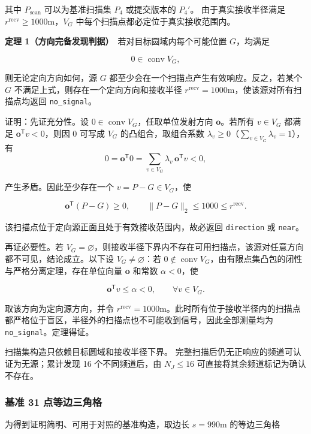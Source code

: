 其中 $P_{\mathrm{scan}}$ 可以为基准扫描集 $P_4$ 或提交版本的 $P_4'$。
由于真实接收半径满足 $r^{\mathrm{recv}}\ge1000\mathrm{m}$，$V_G$ 中每个扫描点都必定位于真实接收范围内。

\textbf{定理 1（方向完备发现判据）}　若对目标圆域内每个可能位置 $G$，均满足

\begin{equation}
0\in\operatorname{conv}V_G,
\label{eq:q4_direction_certificate}
\end{equation}

则无论定向方向如何，源 $G$ 都至少会在一个扫描点产生有效响应。反之，若某个 $G$ 不满足上式，则存在一个定向方向和接收半径 $r^{\mathrm{recv}}=1000\mathrm{m}$，使该源对所有扫描点均返回 \texttt{no\_signal}。

证明：先证充分性。设 $0\in\operatorname{conv}V_G$，任取单位发射方向 $\boldsymbol o$。若所有 $v\in V_G$ 都满足 $\boldsymbol o^{\mathsf T}v<0$，则因 $0$ 可写成 $V_G$ 的凸组合，取组合系数 $\lambda_v\ge0$（$\sum_{v\in V_G}\lambda_v=1$），有
\[
0=\boldsymbol o^{\mathsf T}0=\sum_{v\in V_G}\lambda_v\,\boldsymbol o^{\mathsf T}v<0,
\]

产生矛盾。因此至少存在一个 $v=P-G\in V_G$，使

\[
\boldsymbol o^{\mathsf T}(P-G)\ge0,
\qquad
\lVert P-G\rVert_2\le1000\le r^{\mathrm{recv}}.
\]

该扫描点位于定向源正面且处于有效接收范围内，故必返回 \texttt{direction} 或 \texttt{near}。

再证必要性。若 $V_G=\varnothing$，则接收半径下界内不存在可用扫描点，该源对任意方向都不可见，结论成立。以下设 $V_G\ne\varnothing$：若 $0\notin\operatorname{conv}V_G$，由有限点集凸包的闭性与严格分离定理，存在单位向量 $\boldsymbol o$ 和常数 $\alpha<0$，使

\[
\boldsymbol o^{\mathsf T}v\le\alpha<0,
\qquad
\forall v\in V_G.
\]

取该方向为定向源方向，并令 $r^{\mathrm{recv}}=1000\mathrm{m}$。此时所有位于接收半径内的扫描点都严格位于盲区，半径外的扫描点也不可能收到信号，因此全部测量均为 \texttt{no\_signal}。定理得证。

扫描集构造只依赖目标圆域和接收半径下界。
完整扫描后仍无正响应的频道可认证为无源；累计发现 16 个不同频道后，由 $N_J\le16$ 可直接将其余频道标记为确认不存在。

\subsubsection{基准 31 点等边三角格}

为得到证明简明、可用于对照的基准构造，取边长 $s=990\mathrm{m}$ 的等边三角格


